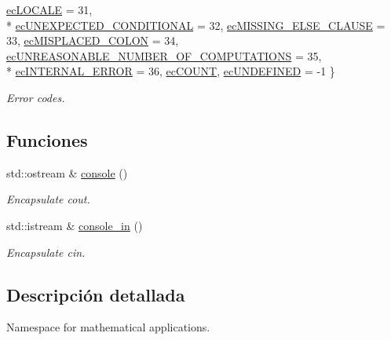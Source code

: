 \begin{DoxyCompactItemize}
\hyperlink{namespacemu_acf304a3ef5c4625d0eac5953aa1b688aa7f2b93cc8c3de8e45b1d7489f2693804}{ec\+L\+O\+C\+A\+LE} = 31, 
\\*
\hyperlink{namespacemu_acf304a3ef5c4625d0eac5953aa1b688aab38d12e1a8995c136661f18b0e259df3}{ec\+U\+N\+E\+X\+P\+E\+C\+T\+E\+D\+\_\+\+C\+O\+N\+D\+I\+T\+I\+O\+N\+AL} = 32, 
\hyperlink{namespacemu_acf304a3ef5c4625d0eac5953aa1b688aaa95a743178c27386926fdcb435ffab90}{ec\+M\+I\+S\+S\+I\+N\+G\+\_\+\+E\+L\+S\+E\+\_\+\+C\+L\+A\+U\+SE} = 33, 
\hyperlink{namespacemu_acf304a3ef5c4625d0eac5953aa1b688aa282864ddfeeb0846e6b79523dbbc3c38}{ec\+M\+I\+S\+P\+L\+A\+C\+E\+D\+\_\+\+C\+O\+L\+ON} = 34, 
\hyperlink{namespacemu_acf304a3ef5c4625d0eac5953aa1b688aa482dd716c466b0cd1fda24d628c5c85b}{ec\+U\+N\+R\+E\+A\+S\+O\+N\+A\+B\+L\+E\+\_\+\+N\+U\+M\+B\+E\+R\+\_\+\+O\+F\+\_\+\+C\+O\+M\+P\+U\+T\+A\+T\+I\+O\+NS} = 35, 
\\*
\hyperlink{namespacemu_acf304a3ef5c4625d0eac5953aa1b688aa91b338cf5e35059bb452f783aeb88a5f}{ec\+I\+N\+T\+E\+R\+N\+A\+L\+\_\+\+E\+R\+R\+OR} = 36, 
\hyperlink{namespacemu_acf304a3ef5c4625d0eac5953aa1b688aad0077acc7594040e4dd7fe5de229b455}{ec\+C\+O\+U\+NT}, 
\hyperlink{namespacemu_acf304a3ef5c4625d0eac5953aa1b688aa49ba8c4fa03b5e822bc4573f84d44062}{ec\+U\+N\+D\+E\+F\+I\+N\+ED} = -\/1
 \}\begin{DoxyCompactList}\small\item\em Error codes. \end{DoxyCompactList}
\end{DoxyCompactItemize}
\subsection*{Funciones}
\begin{DoxyCompactItemize}
\item 
std\+::ostream \& \hyperlink{namespacemu_a0346964f0b93f6c904a9964387522d97}{console} ()
\begin{DoxyCompactList}\small\item\em Encapsulate cout. \end{DoxyCompactList}\item 
std\+::istream \& \hyperlink{namespacemu_a4bcc4027b54951ec8c490fb8d0f68a1d}{console\+\_\+in} ()
\begin{DoxyCompactList}\small\item\em Encapsulate cin. \end{DoxyCompactList}\end{DoxyCompactItemize}


\subsection{Descripción detallada}
Namespace for mathematical applications. 

